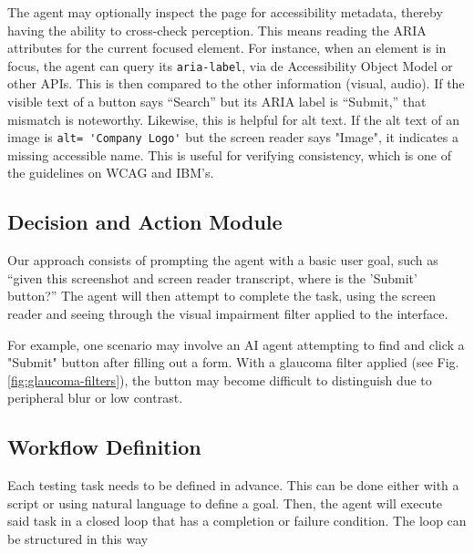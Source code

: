 The agent may optionally inspect the page for accessibility metadata, thereby having the ability to cross-check perception. This means reading the ARIA attributes for the current focused element. For instance, when an element is in focus, the agent can query its \verb|aria-label|, via de Accessibility Object Model or other APIs. This is then compared to the other information (visual, audio). If the visible text of a button says “Search” but its ARIA label is “Submit,” that mismatch is noteworthy. Likewise, this is helpful for alt text. If the alt text of an image is \verb|alt= 'Company Logo'| but the screen reader says "Image", it indicates a missing accessible name. This is useful for verifying consistency, which is one of the guidelines on \ac{WCAG} and IBM's\cite{ibm2025accessibility}.


\subsection{Decision and Action Module}

Our approach consists of prompting the agent with a basic user goal, such as “given this screenshot and screen reader transcript, where is the 'Submit' button?” The agent will then attempt to complete the task, using the screen reader and seeing through the visual impairment filter applied to the interface.

For example, one scenario may involve an \ac{AI} agent attempting to find and click a "Submit" button after filling out a form. With a glaucoma filter applied (see Fig. \ref{fig:glaucoma-filters}), the button may become difficult to distinguish due to peripheral blur or low contrast.


\subsection{Workflow Definition}

Each testing task needs to be defined in advance. This can be done either with a script or using natural language to define a goal. Then, the agent will execute said task in a closed loop that has a completion or failure condition. The loop can be structured in this way

